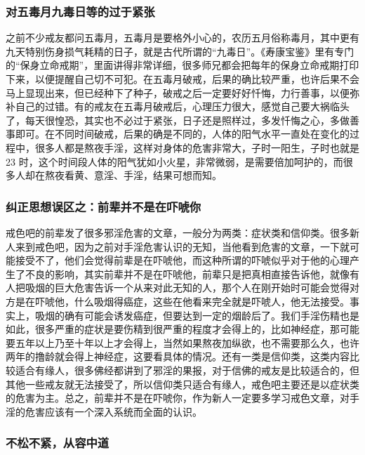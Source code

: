 \subsubsection{对五毒月九毒日等的过于紧张}

之前不少戒友都问五毒月，五毒月是要格外小心的，农历五月俗称毒月，其中更有九天特别伤身损气耗精的日子，就是古代所谓的“九毒日”。《寿康宝鉴》里有专门的“保身立命戒期”，里面讲得非常详细，很多师兄都会把每年的保身立命戒期打印下来，以便提醒自己切不可犯。在五毒月破戒，后果的确比较严重，也许后果不会马上显现出来，但已经种下了种子，破戒之后一定要好好忏悔，力行善事，以便弥补自己的过错。有的戒友在五毒月破戒后，心理压力很大，感觉自己要大祸临头了，每天很惶恐，其实也不必过于紧张，日子还是照样过，多发忏悔之心，多做善事即可。在不同时间破戒，后果的确是不同的，人体的阳气水平一直处在变化的过程中，很多人都是熬夜手淫，这样对身体的危害非常大，子时一阳生，子时也就是 23 时，这个时间段人体的阳气犹如小火星，非常微弱，是需要倍加呵护的，而很多人却在熬夜看黄、意淫、手淫，结果可想而知。

\subsubsection{纠正思想误区之：前辈并不是在吓唬你}

戒色吧的前辈发了很多邪淫危害的文章，一般分为两类：症状类和信仰类。很多新人来到戒色吧，因为之前对手淫危害认识的无知，当他看到危害的文章，一下就可能接受不了，他们会觉得前辈是在吓唬他，而这种所谓的吓唬似乎对于他的心理产生了不良的影响，其实前辈并不是在吓唬他，前辈只是把真相直接告诉他，就像有人把吸烟的巨大危害告诉一个从来对此无知的人，那个人在刚开始时可能会觉得对方是在吓唬他，什么吸烟得癌症，这些在他看来完全就是吓唬人，他无法接受。事实上，吸烟的确有可能会诱发癌症，但要达到一定的烟龄后了。我们手淫伤精也是如此，很多严重的症状是要伤精到很严重的程度才会得上的，比如神经症，那可能要五年以上乃至十年以上才会得上，当然如果熬夜加纵欲，也不需要那么久，也许两年的撸龄就会得上神经症，这要看具体的情况。还有一类是信仰类，这类内容比较适合有缘人，很多佛经都讲到了邪淫的果报，对于信佛的戒友是比较适合的，但其他一些戒友就无法接受了，所以信仰类只适合有缘人，戒色吧主要还是以症状类的危害为主。总之，前辈并不是在吓唬你，作为新人一定要多学习戒色文章，对手淫的危害应该有一个深入系统而全面的认识。

\subsubsection{不松不紧，从容中道}

